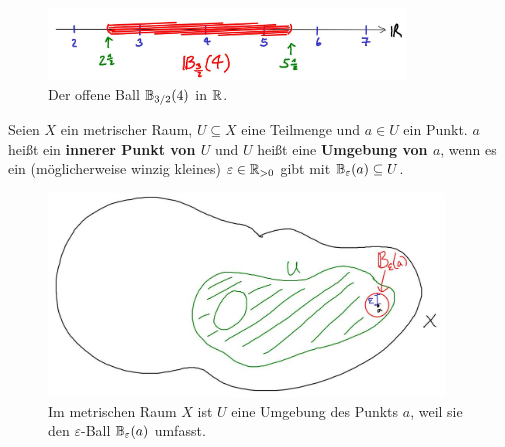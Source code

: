\begin{figure}[ht]
    \includegraphics[width=9.5cm]{./_img/1Dball.jpeg}
    \centering \caption{Der offene Ball $\mathbb B_{3/2}(4)$ in $\mathbb R$.}
\end{figure}


\begin{defin} \label{def:umgebung}  
    Seien $X$ ein metrischer Raum, $U\subseteq X$ eine Teilmenge und $a\in U$ ein Punkt. $a$ heißt ein \textbf{innerer Punkt von $U$} und $U$ heißt eine \textbf{Umgebung von $a$}, wenn es ein (möglicherweise winzig kleines) $\varepsilon\in \mathbb R_{>0}$ gibt mit $\mathbb B_\varepsilon(a)\subseteq U$.
    \begin{figure}[p]
        \includegraphics[width=10.5cm]{./_img/Umgebung.jpeg}
        \centering \caption{Im metrischen Raum $X$ ist $U$ eine Umgebung des Punkts $a$, weil sie den $\varepsilon$-Ball $\mathbb B_\varepsilon(a)$ umfasst.}
    \end{figure}
\end{defin}


